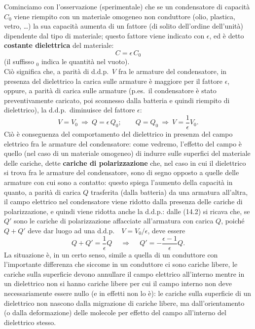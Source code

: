 Cominciamo con l'osservazione (sperimentale) che se un condensatore di
capacit\`a $C_0$ viene riempito con un materiale omogeneo non conduttore (olio,
plastica, vetro, \dots) la sua capacit\`a aumenta di un fattore (di solito
dell'ordine dell'unit\`a) dipendente dal tipo di materiale; questo fattore viene
indicato con $\epsilon$, ed \`e detto \textbf{costante dielettrica} del
materiale:
\begin{equation}
  C=\epsilon\,C_0
  \tag{14.1}
\end{equation}
(il suffisso $_0$ indica le quantit\`a nel vuoto).\\
Ci\`o significa che, a parit\`a di d.d.p.\ $V$ fra le armature del condensatore,
in presenza del dielettrico la carica sulle armature \`e maggiore per il fattore
$\epsilon$, oppure, a parit\`a di carica sulle armature (p.es.\ il condensatore
\`e stato preventivamente caricato, poi sconnesso dalla batteria e quindi
riempito di dielettrico), la d.d.p.\ diminuisce del fattore $\epsilon$:
\begin{equation}
  V=V_0\ \Rightarrow\ Q=\epsilon\,Q_0;
  \qquad Q=Q_0\ \Rightarrow\ V=\frac{1}{\epsilon}V_0.
  \tag{14.2}
\end{equation}
Ci\`o \`e conseguenza del comportamento del dielettrico in presenza del campo
elettrico fra le armature del condensatore: come vedremo, l'effetto del campo
\`e quello (nel caso di un materiale omogeneo) di indurre sulle superfici del
materiale delle cariche, dette \textbf{cariche di polarizzazione} che, nel caso
in cui il dielettrico si trova fra le armature del condensatore, sono di segno
opposto a quelle delle armature con cui sono a contatto: questo spiega l'aumento
della capacit\`a in quanto, a parit\`a di carica $Q$ trasferita (dalla batteria)
da una armatura all'altra, il campo elettrico nel condensatore viene ridotto
dalla presenza delle cariche di polarizzazione, e quindi viene ridotta anche la
d.d.p.: dalle (14.2) si ricava che, se $Q'$ sono le cariche di polarizzazione
affacciate all'armatura con carica $Q$, poich\'e $Q+Q'$ deve dar luogo ad una
d.d.p.\ \ $V=V_0/\epsilon$, deve essere
\begin{equation}
  Q+Q'=\frac{1}{\epsilon}Q
  \quad\ \Rightarrow\quad\ Q'=-\frac{\epsilon-1}{\epsilon}Q.
  \tag{14.3}
\end{equation}
La situazione \`e, in un certo senso, simile a quella di un conduttore con
l'importante differenza che siccome in un conduttore ci sono cariche libere, le
cariche sulla superficie devono annullare il campo elettrico all'interno mentre
in un dielettrico non si hanno cariche libere per cui il campo interno non deve
necessariamente essere nullo (e in effetti non lo \`e): le cariche sulla
superficie di un dielettrico non nascono dalla migrazione di cariche libere, ma
dall'orientamento (o dalla deformazione) delle molecole per effetto del campo
all'interno del dielettrico stesso.

